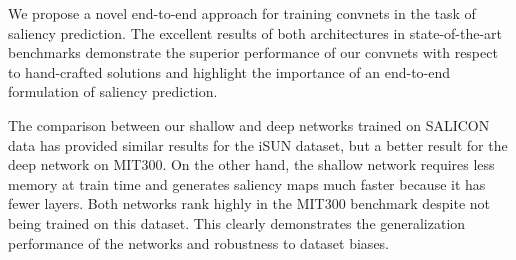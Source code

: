 \documentclass[10pt,twocolumn,letterpaper]{article}
\begin{document}
We propose a novel end-to-end approach for training convnets in the task of saliency prediction.
The excellent results of both architectures in state-of-the-art benchmarks demonstrate the superior performance of our convnets with respect to hand-crafted solutions and highlight the importance of an end-to-end formulation of saliency prediction.%

The comparison between our shallow and deep networks trained on SALICON data has provided similar results for the iSUN dataset, but a better result for the deep network on MIT300.
On the other hand, the shallow network requires less memory at train time and generates saliency maps much faster because it has fewer layers. %
Both networks rank highly in the MIT300 benchmark despite not being trained on this dataset.
This clearly demonstrates the generalization performance of the networks and robustness to dataset biases.

%
\end{document}
